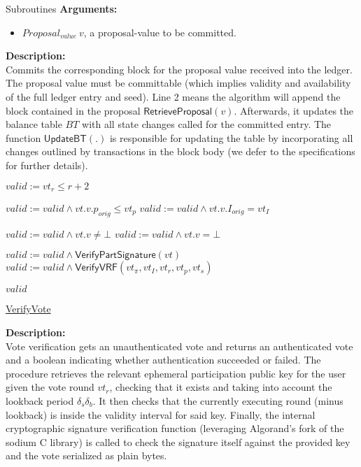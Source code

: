 \documentclass[10pt,a4paper]{article}
\begin{document}
\begin{section}{Subroutines}
\noindent \textbf{Arguments:}
\begin{itemize}
    \item $Proposal_{value} \ v$, a proposal-value to be committed.
  \end{itemize}

\noindent \textbf{Description:}\\
Commits the corresponding block for the proposal value received into the ledger.
The proposal value must be committable (which implies validity and availability of the full
ledger entry and seed).
Line 2 means the algorithm will append the block contained in the proposal $\mathsf{RetrieveProposal}(v)$.
Afterwards, it updates the balance table $BT$ with all state changes called for the committed entry.
The function $\mathsf{UpdateBT}(.)$ is responsible for updating the table by incorporating all changes
outlined by transactions in the block body (we defer to the specifications for further details). 


\begin{algorithm}[H]\label{algo:verify-vote}
    \begin{algorithmic}[1]
        \State $valid := vt_r \leq r+2$
        
            \State $valid := valid \land vt.v.p_{orig} \leq vt_p$
                \State $valid := valid \land vt.v.I_{orig} = vt_I$
            \EndIf
        \EndIf
        
            \State $valid := valid \land vt.v \neq \bot$
            \State $valid := valid \land vt.v = \bot$
        \EndIf

        \State $valid := valid \land \mathsf{VerifyPartSignature}(vt)$
        \State $valid := valid \land \mathsf{VerifyVRF}(vt_{\pi}, vt_I, vt_r, vt_p, vt_s)$

        \Return $valid$
    \EndFunction
    \end{algorithmic}
    \caption{\underline{VerifyVote}}
\end{algorithm}

\noindent \textbf{Description:}\\
Vote verification gets an unauthenticated vote and returns an authenticated vote and a
boolean indicating whether authentication succeeded or failed.
The procedure retrieves the relevant ephemeral participation public key for the user given the vote round $vt_r$,
checking that it exists and taking into account the lookback period $\delta_s\delta_b$.
It then checks that the currently executing round (minus lookback) is inside the validity interval for said key.
Finally, the internal cryptographic signature verification function (leveraging Algorand's fork of the sodium C library)
is called to check the signature itself against the provided key and the vote serialized as plain bytes.


\end{section}
\end{document}
